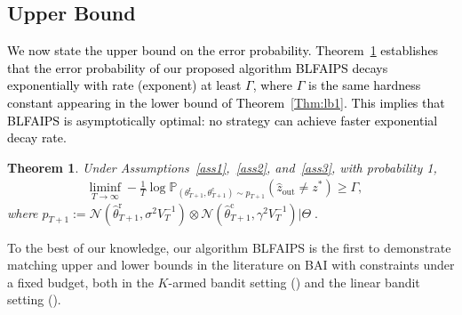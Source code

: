 \documentclass[accepted]{uai2025} %
\newcommand{\red}[1]{\textcolor{black}{#1}}
\theoremstyle{plain}
\newtheorem{theorem}{Theorem}[section]
\theoremstyle{definition}
\theoremstyle{remark}
\newcommand{\thetac}{\theta^{\mathrm{c}}}
\newcommand{\thetar}{\theta^{\mathrm{r}}}
\begin{document}
\subsection{Upper Bound}\vspace{-.1in}
\red{We now state the upper bound on the error probability. Theorem~\ref{upperbound} establishes that the error probability of our proposed algorithm BLFAIPS decays exponentially with rate (exponent) at least \( \Gamma \), where \( \Gamma \) is the same hardness constant appearing in the lower bound of Theorem~\ref{Thm:lb1}. This implies that BLFAIPS  is asymptotically optimal: no strategy can achieve  faster exponential decay rate. %
}
\begin{theorem}
    \label{upperbound}
    Under Assumptions~\ref{ass1},~\ref{ass2}, and~\ref{ass3}, with probability 1,
    \begin{align*}
        \liminf_{T \to \infty} -\frac{1}{T} \log \mathbb{P}_{(\thetar_{T+1},\thetac_{T+1})\sim p_{T+1}} (\hat{z}_\text{{out}} \neq z^*) \ge \Gamma, 
\quad 
    \end{align*}
    where $p_{T+1}:=\mathcal{N}(\hat{\theta}^\mathrm{r}_{T+1}, \sigma^2 V_{T}^{-1})\otimes \mathcal{N}(\hat{\theta}^\mathrm{c}_{T+1}, \gamma^2 V_{T}^{-1} )| \Theta_{}~.$
\end{theorem}
    To the best of our knowledge, our algorithm BLFAIPS is the first to demonstrate matching upper and lower bounds in the literature on BAI with constraints under a fixed budget, both in the $K$-armed bandit setting (\cite{faizal2022constrained}) and the linear bandit setting (\cite{tang2024pure}).

\vspace{-.1in}
\end{document}
